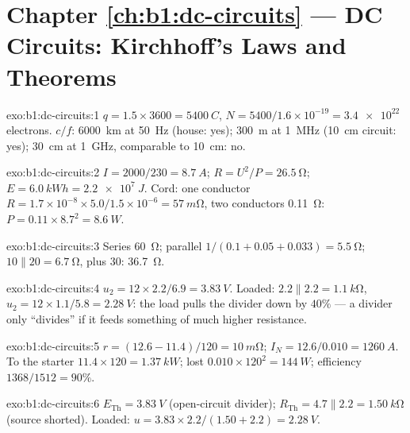 \section*{Chapter \ref{ch:b1:dc-circuits} --- DC Circuits: Kirchhoff's Laws and Theorems}

\begin{solution}{exo:b1:dc-circuits:1}
$q = 1.5 \times 3600 = \qty{5400}{C}$, $N = 5400/1.6\times10^{-19} =
\num{3.4e22}$ electrons. $c/f$: \qty{6000}{km} at \qty{50}{Hz} (house:
yes); \qty{300}{m} at \qty{1}{MHz} (\qty{10}{cm} circuit: yes);
\qty{30}{cm} at \qty{1}{GHz}, comparable to \qty{10}{cm}: no.
\end{solution}

\begin{solution}{exo:b1:dc-circuits:2}
$I = 2000/230 = \qty{8.7}{A}$; $R = U^2/P = \qty{26.5}{\ohm}$; $E =
\qty{6.0}{kWh} = \qty{2.2e7}{J}$. Cord: one conductor $R = 1.7\times10^{-8}
\times 5.0/1.5\times10^{-6} = \qty{57}{m\ohm}$, two conductors
\qty{0.11}{\ohm}: $P = 0.11 \times 8.7^2 = \qty{8.6}{W}$.
\end{solution}

\begin{solution}{exo:b1:dc-circuits:3}
Series \qty{60}{\ohm}; parallel $1/(0.1 + 0.05 + 0.033) = \qty{5.5}{\ohm}$;
$10 \parallel 20 = \qty{6.7}{\ohm}$, plus $30$: \qty{36.7}{\ohm}.
\end{solution}

\begin{solution}{exo:b1:dc-circuits:4}
$u_2 = 12 \times 2.2/6.9 = \qty{3.83}{V}$. Loaded: $2.2 \parallel 2.2 =
\qty{1.1}{k\ohm}$, $u_2 = 12 \times 1.1/5.8 = \qty{2.28}{V}$: the load
pulls the divider down by $40\%$ --- a divider only ``divides'' if it
feeds something of much higher resistance.
\end{solution}

\begin{solution}{exo:b1:dc-circuits:5}
$r = (12.6 - 11.4)/120 = \qty{10}{m\ohm}$; $I_N = 12.6/0.010 =
\qty{1260}{A}$. To the starter $11.4 \times 120 = \qty{1.37}{kW}$; lost
$0.010 \times 120^2 = \qty{144}{W}$; efficiency $1368/1512 = 90\%$.
\end{solution}

\begin{solution}{exo:b1:dc-circuits:6}
$E_{\mathrm{Th}} = \qty{3.83}{V}$ (open-circuit divider); $R_{\mathrm{Th}}
= 4.7 \parallel 2.2 = \qty{1.50}{k\ohm}$ (source shorted). Loaded:
$u = 3.83 \times 2.2/(1.50 + 2.2) = \qty{2.28}{V}$.
\end{solution}

